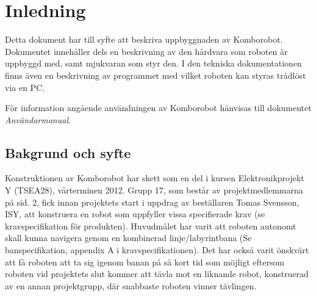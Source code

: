 
%
%


\section{Inledning}
Detta dokument har till syfte att beskriva uppbyggnaden av Komborobot.
Dokumentet innehåller dels en beskrivning av den hårdvara som roboten är 
uppbyggd med, samt mjukvaran som styr den. I den tekniska dokumentationen 
finns även en beskrivning av programmet med vilket roboten kan styras trådlöst 
via en PC. 

För information angående användningen av Komborobot hänvisas till dokumentet \emph{Användarmanual}. 

\subsection{Bakgrund och syfte}
Konstruktionen av Komborobot har skett som en del i kursen Elektronikprojekt Y (TSEA28), vårterminen 2012. Grupp 17, som består av projektmedlemmarna på sid. 2, fick innan projektets start i uppdrag av beställaren Tomas Svensson, ISY, att konstruera en robot som uppfyller vissa specifierade krav (se kravspecifikation för produkten). Huvudmålet har varit att roboten autonomt skall kunna navigera genom en kombinerad linje/labyrintbana (Se banspecifikation, appendix A i kravspecifikationen).  Det har också varit önskvärt att få roboten att ta sig igenom banan på så kort tid som möjligt eftersom roboten vid projektets slut kommer att tävla mot en liknande robot, konstruerad av en annan projektgrupp, där snabbaste roboten vinner tävlingen.

